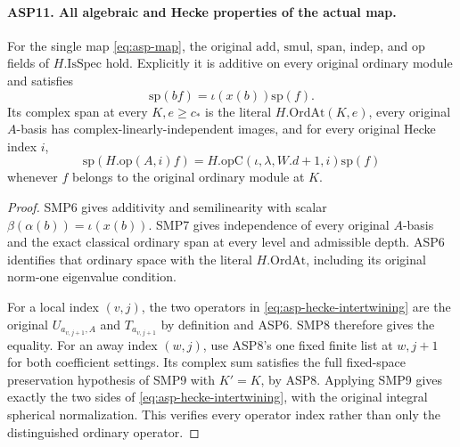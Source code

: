 \documentclass[11pt,a4paper]{article}
\numberwithin{equation}{section}
\theoremstyle{remark}\newtheorem{remark}[theorem]{Remark}
\begin{document}
\paragraph{ASP11. All algebraic and Hecke properties of the actual map.}
\label{claim:ASP11}
For the single map \eqref{eq:asp-map}, the
original $\mathrm{add}$, $\mathrm{smul}$,
$\mathrm{span}$, $\mathrm{indep}$, and
$\mathrm{op}$ fields of $H.\mathrm{IsSpec}$ hold.
Explicitly it is additive on every original
ordinary module and satisfies
\[
                \mathrm{sp}(bf)=\iota(x(b))\mathrm{sp}(f).
\]
Its complex span at every $K,\allowbreak{} e\geq c_*$ is
the literal $H.\mathrm{OrdAt}(K,\allowbreak{} e)$, every
original $A$-basis has complex-linearly-independent
images, and for every original Hecke index $i$,
\begin{equation}\label{eq:asp-hecke-intertwining}
              \mathrm{sp}(H.\mathrm{op}(A,\allowbreak{} i)f)
                  =H.\mathrm{opC}(\iota,\lambda,\allowbreak{} W.d+1,\allowbreak{} i)
                                                   \mathrm{sp}(f)
\end{equation}
whenever $f$ belongs to the original ordinary module
at $K$.
\begin{proof}
SMP6 gives additivity and semilinearity with scalar
$\beta(\alpha(b))=\iota(x(b))$.
SMP7 gives independence of every original
$A$-basis and the exact classical ordinary span
at every level and admissible depth.  ASP6
identifies that ordinary space with the literal
$H.\mathrm{OrdAt}$, including its original
norm-one eigenvalue condition.

For a local index $(v,\allowbreak{} j)$, the two operators
in \eqref{eq:asp-hecke-intertwining} are the
original $U_{a_{v,\allowbreak{} j+1},\allowbreak{} A}$ and
$T_{a_{v,\allowbreak{} j+1}}$ by definition and ASP6.
SMP8 therefore gives the equality.  For an
away index $(w,\allowbreak{} j)$, use ASP8's one fixed
finite list at $w,\allowbreak{} j+1$ for both coefficient
settings.  Its complex sum satisfies the
full fixed-space preservation hypothesis of
SMP9 with $K'=K$, by ASP8.  Applying SMP9
gives exactly the two sides of
\eqref{eq:asp-hecke-intertwining}, with the
original integral spherical normalization.
This verifies every operator index rather
than only the distinguished ordinary operator.
\end{proof}

\end{document}
